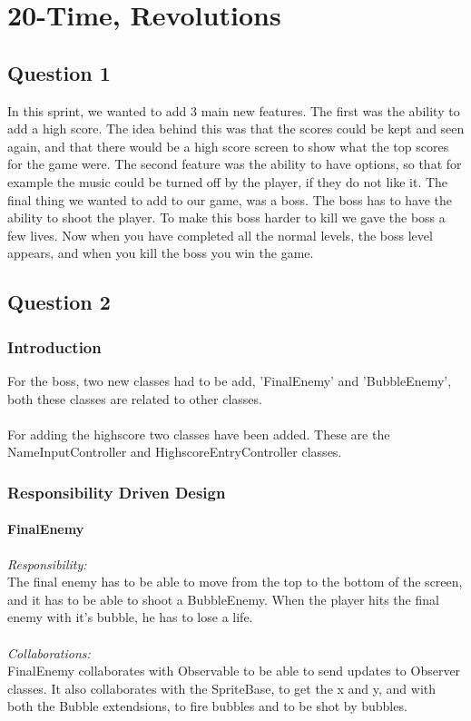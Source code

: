 \chapter{20-Time, Revolutions}

\section{Question 1}

In this sprint, we wanted to add 3 main new features. The first was the ability to add a high score. The idea behind this was that the scores could be kept and seen again, and that there would be a high score screen to show what the top scores for the game were. The second feature was the ability to have options, so that for example the music could be turned off by the player, if they do not like it. The final thing we wanted to add to our game, was a boss. The boss has to have the ability to shoot the player. To make this boss harder to kill we gave the boss a few lives. Now when you have completed all the normal levels, the boss level appears, and when you kill the boss you win the game.

\section{Question 2}

\subsection{Introduction}

For the boss, two new classes had to be add, 'FinalEnemy' and 'BubbleEnemy', both these classes are related to other classes. \\\\
For adding the highscore two classes have been added. These are the NameInputController and HighscoreEntryController classes. 

\subsection{Responsibility Driven Design} 

\subsubsection{FinalEnemy}
\textit{Responsibility:} \\
The final enemy has to be able to move from the top to the bottom of the screen, and it has to be able to shoot a BubbleEnemy. When the player hits the final enemy with it's bubble, he has to lose a life. \\ \\
\textit{Collaborations:} \\
FinalEnemy collaborates with Observable to be able to send updates to Observer classes. It also collaborates with  the SpriteBase, to get the x and y, and with both the Bubble extendsions, to fire bubbles and to be shot by bubbles.

